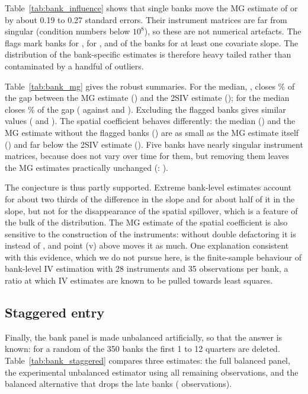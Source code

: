 Table~\ref{tab:bank_influence} shows that single banks move the MG estimate
of  or  by about 0.19 to 0.27 standard errors. Their
instrument matrices are far from singular (condition numbers below
$10^{8}$), so these are not numerical artefacts. The flags mark
\BankNflagSize{} banks for , \BankNflagBuffer{} for
, and \BankNflag{} of the \BankNunits{} banks for at least one
covariate slope. The distribution of the bank-specific estimates is
therefore heavy tailed rather than contaminated by a handful of outliers.

Table~\ref{tab:bank_mg} gives the robust summaries. For  the
median, \BankMedSize, closes \BankGapCutSize\% of the gap between the MG
estimate (\BankMGsize) and the 2SIV estimate (\BankTwoSize); for
 the median closes \BankGapCutBuffer\% of the gap
(\BankMedBuffer{} against \BankMGbuffer{} and \BankTwoBuffer). Excluding the
flagged banks gives similar values (\BankExclSize{} and \BankExclBuffer).
The spatial coefficient behaves differently: the median (\BankMedPsi) and
the MG estimate without the flagged banks (\BankExclPsi) are as small as the
MG estimate itself (\BankMGpsi) and far below the 2SIV estimate
(\BankTwoPsi). Five banks have nearly singular instrument matrices, because
 does not vary over time for them, but removing them leaves
the MG estimates practically unchanged (: \BankExclIllSize).

The conjecture is thus partly supported. Extreme bank-level estimates
account for about two thirds of the difference in the  slope and
for about half of it in the  slope, but not for the
disappearance of the spatial spillover, which is a feature of the bulk of
the distribution. The MG estimate of the spatial coefficient is also
sensitive to the construction of the instruments: without double
defactoring it is \BankMGpsiNoDD{} instead of \BankMGpsi{}, and point (v)
above moves it as much. One explanation consistent with this evidence,
which we do not pursue here, is the finite-sample behaviour of bank-level
IV estimation with 28 instruments and 35 observations per bank, a ratio at
which IV estimates are known to be pulled towards least squares.

\subsection{Staggered entry}

Finally, the bank panel is made unbalanced artificially, so that the answer
is known: for a random \BankNlate{} of the 350 banks the first 1 to 12
quarters are deleted. Table~\ref{tab:bank_staggered} compares three
estimates: the full balanced panel, the experimental unbalanced estimator
using all \BankNobsStag{} remaining observations, and the balanced
alternative that drops the late banks (\BankNobsDrop{} observations).

